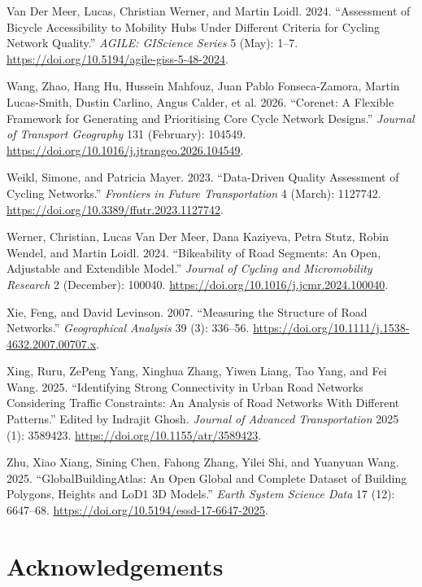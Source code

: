 \documentclass[
  sn-nature,
]{sn-jnl}
\newlength{\cslhangindent}
\newenvironment{CSLReferences}[2] %
 {\begin{list}{}{%
  \setlength{\itemindent}{0pt}
  \setlength{\leftmargin}{0pt}
  \setlength{\parsep}{0pt}
  \ifodd #1
   \setlength{\leftmargin}{\cslhangindent}
   \setlength{\itemindent}{-1\cslhangindent}
  \fi
  \setlength{\itemsep}{#2\baselineskip}}}
 {\end{list}}
\begin{document}
\begin{CSLReferences}{1}{0}
Van Der Meer, Lucas, Christian Werner, and Martin Loidl. 2024.
{``Assessment of Bicycle Accessibility to Mobility Hubs Under Different
Criteria for Cycling Network Quality.''} \emph{AGILE: GIScience Series}
5 (May): 1--7. \url{https://doi.org/10.5194/agile-giss-5-48-2024}.

Wang, Zhao, Hang Hu, Hussein Mahfouz, Juan Pablo Fonseca-Zamora, Martin
Lucas-Smith, Dustin Carlino, Angus Calder, et al. 2026. {``Corenet: A
Flexible Framework for Generating and Prioritising Core Cycle Network
Designs.''} \emph{Journal of Transport Geography} 131 (February):
104549. \url{https://doi.org/10.1016/j.jtrangeo.2026.104549}.

Weikl, Simone, and Patricia Mayer. 2023. {``Data-Driven Quality
Assessment of Cycling Networks.''} \emph{Frontiers in Future
Transportation} 4 (March): 1127742.
\url{https://doi.org/10.3389/ffutr.2023.1127742}.

Werner, Christian, Lucas Van Der Meer, Dana Kaziyeva, Petra Stutz, Robin
Wendel, and Martin Loidl. 2024. {``Bikeability of Road Segments: An
Open, Adjustable and Extendible Model.''} \emph{Journal of Cycling and
Micromobility Research} 2 (December): 100040.
\url{https://doi.org/10.1016/j.jcmr.2024.100040}.

Xie, Feng, and David Levinson. 2007. {``Measuring the Structure of Road
Networks.''} \emph{Geographical Analysis} 39 (3): 336--56.
\url{https://doi.org/10.1111/j.1538-4632.2007.00707.x}.

Xing, Ruru, ZePeng Yang, Xinghua Zhang, Yiwen Liang, Tao Yang, and Fei
Wang. 2025. {``Identifying Strong Connectivity in Urban Road Networks
Considering Traffic Constraints: An Analysis of Road Networks With
Different Patterns.''} Edited by Indrajit Ghosh. \emph{Journal of
Advanced Transportation} 2025 (1): 3589423.
\url{https://doi.org/10.1155/atr/3589423}.

Zhu, Xiao Xiang, Sining Chen, Fahong Zhang, Yilei Shi, and Yuanyuan
Wang. 2025. {``GlobalBuildingAtlas: An Open Global and Complete Dataset
of Building Polygons, Heights and LoD1 3D Models.''} \emph{Earth System
Science Data} 17 (12): 6647--68.
\url{https://doi.org/10.5194/essd-17-6647-2025}.

\end{CSLReferences}

\section{Acknowledgements}\label{acknowledgements}
\end{document}
